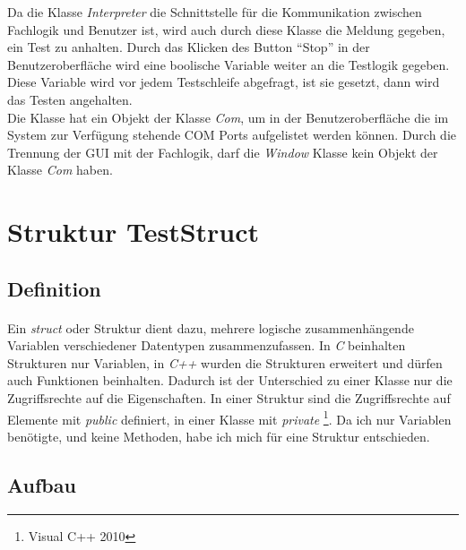 Da die Klasse \textit{Interpreter} die Schnittstelle für die Kommunikation zwischen Fachlogik und Benutzer ist, wird auch durch diese Klasse die Meldung gegeben, ein Test zu anhalten. Durch das Klicken des Button "`Stop"' in der Benutzeroberfläche wird eine boolische Variable weiter an die Testlogik gegeben. Diese Variable wird vor jedem Testschleife abgefragt, ist sie gesetzt, dann wird das Testen angehalten.\\

Die Klasse hat ein Objekt der Klasse \textit{Com}, um in der Benutzeroberfläche die im System zur Verfügung stehende COM Ports aufgelistet werden können. Durch die Trennung der GUI mit der Fachlogik, darf die \textit{Window} Klasse kein Objekt der Klasse \textit{Com} haben.\\



\newpage

\section{Struktur TestStruct}\label{TestStruct}
\subsection{Definition}
\paragraph{}
Ein \textit{struct} oder Struktur dient dazu, mehrere logische zusammenhängende Variablen verschiedener Datentypen zusammenzufassen. In \textit{C} beinhalten Strukturen nur Variablen, in \textit{C++} wurden die Strukturen erweitert und dürfen auch Funktionen beinhalten. Dadurch ist der Unterschied zu einer Klasse nur die Zugriffsrechte auf die Eigenschaften. In einer Struktur sind die Zugriffsrechte auf Elemente mit  \textit{public} definiert, in einer Klasse mit \textit{private} \footnote{Visual C++ 2010}. Da ich nur Variablen benötigte, und keine Methoden, habe ich mich für eine Struktur entschieden.


\subsection{Aufbau}

